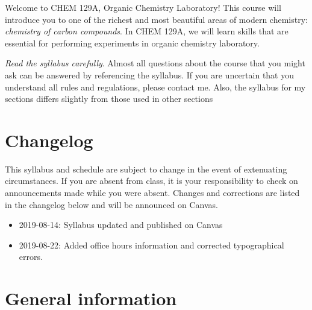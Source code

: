 \newpage

Welcome to CHEM 129A, Organic Chemistry Laboratory! This course will
introduce you to one of the richest and most beautiful areas of modern
chemistry: \emph{chemistry of carbon compounds}. In CHEM 129A, we will
learn skills that are essential for performing experiments in organic
chemistry laboratory.

\emph{Read the syllabus carefully}. Almost all questions about the
course that you might ask can be answered by referencing the syllabus.
If you are uncertain that you understand all rules and regulations,
please contact me. Also, the syllabus for my sections differs slightly
from those used in other sections

\hypertarget{changelog}{%
\section{Changelog}\label{changelog}}

This syllabus and schedule are subject to change in the event of
extenuating circumstances. If you are absent from class, it is your
responsibility to check on announcements made while you were absent.
Changes and corrections are listed in the changelog below and will be
announced on Canvas.

\begin{itemize}
\tightlist
\item
  2019-08-14: Syllabus updated and published on Canvas
\item
  2019-08-22: Added office hours information and corrected typographical
  errors.
\end{itemize}

\hypertarget{general-information}{%
\section{General information}\label{general-information}}

